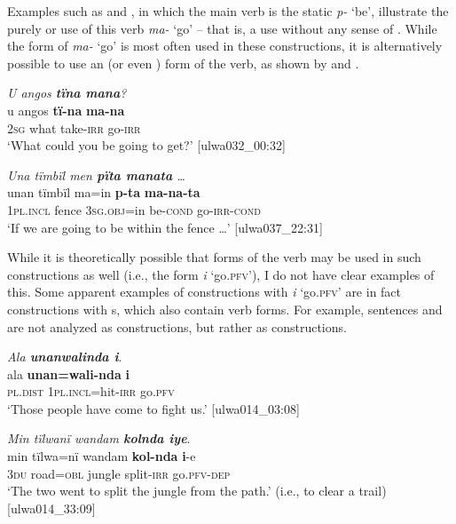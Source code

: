 Examples such as  and , in which the main verb is the static  \textit{p-} ‘be’, illustrate the purely  or  use of this verb \textit{ma-} ‘go’ -- that is, a use without any sense of . While the  form of \textit{ma-} ‘go’ is most often used in these constructions, it is alternatively possible to use an  (or even ) form of the verb, as shown by  and .

\ea%
    \label{ex:pred:57}
          \textit{U angos \textbf{tïna mana}?}\\
\gll u    angos  \textbf{tï-na}    \textbf{ma-na}\\
    2\textsc{sg}  what  take-\textsc{irr}  go-\textsc{irr}\\
\glt `What could you be going to get?’ [ulwa032\_00:32]
\z

\ea%
    \label{ex:pred:58}
          \textit{Una tïmbïl men \textbf{pïta manata} …}\\
\gll    unan    tïmbïl  ma=in      \textbf{p-ta}    \textbf{ma-na-ta}\\
    1\textsc{pl.incl}  fence  3\textsc{sg.obj}=in  be\textsc{{}-cond} go-\textsc{irr-cond}\\
\glt `If we are going to be within the fence …’ [ulwa037\_22:31]
\z

While it is theoretically possible that  forms of the verb may be used in such constructions as well (i.e., the  form \textit{i} ‘go.\textsc{pfv’}), I do not have clear examples of this. Some apparent examples of   constructions with \textit{i} ‘go.\textsc{pfv}’ are in fact constructions with s, which also contain  verb forms. For example, sentences  and  are not analyzed as   constructions, but rather as  constructions.

\ea%
    \label{ex:pred:59}
          \textit{Ala \textbf{unanwalinda i}}.\\
\gll ala      \textbf{unan=wali-nda}  \textbf{i}\\
    \textsc{pl.dist}  \textsc{1pl.incl=}hit-\textsc{irr}  go.\textsc{pfv}\\
\glt `Those people have come to fight us.’ [ulwa014\_03:08]
\z

\ea%
    \label{ex:pred:60}
          \textit{Min tïlwanï wandam \textbf{kolnda iye}}.\\
\gll min  tïlwa=nï  wandam  \textbf{kol-nda}  \textbf{i}{}-e\\
    3\textsc{du}  road=\textsc{obl}  jungle    split-\textsc{irr}  go.\textsc{pfv-dep}\\
\glt `The two went to split the jungle from the path.’ (i.e., to clear a trail) [ulwa014\_33:09]
\z


